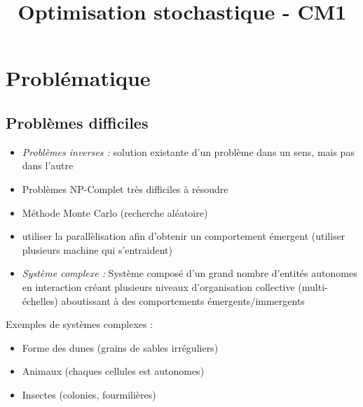 \documentclass[11pt,a4paper]{article}
\title{Optimisation stochastique - CM1}
\begin{document}
	
	\maketitle
	
	\section{Problématique}
	
	\subsection{Problèmes difficiles}
	
	\begin{itemize}
		\item \textit{Problèmes inverses :} solution existante d'un problème dans un sens, mais pas dans l'autre
		\item Problèmes NP-Complet très difficiles à résoudre
		\item Méthode Monte Carlo (recherche aléatoire)
		\item utiliser la parallèlisation afin d'obtenir un comportement émergent (utiliser plusieurs machine qui s'entraident)
		\item \textit{Système complexe :} Système composé d'un grand nombre d'entités autonomes en interaction créant plusieurs niveaux d'organisation collective (multi-échelles) aboutissant à des comportements émergents/immergents
	\end{itemize}

	Exemples de systèmes complexes :
	\begin{itemize}
		\item Forme des dunes (grains de sables irréguliers)
		\item Animaux (chaques cellules est autonomes)
		\item Insectes (colonies, fourmilières)
	\end{itemize}
	
	
	
\end{document}

